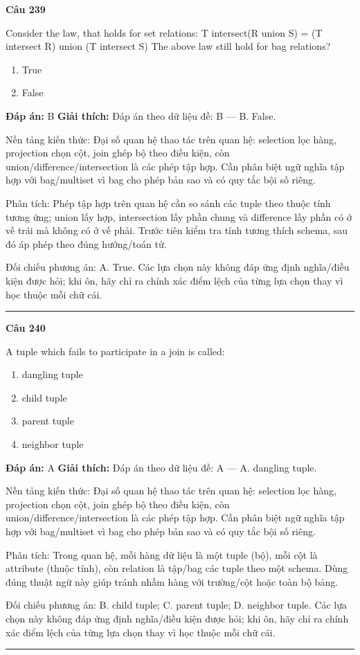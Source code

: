 \documentclass[11pt,a4paper]{article}
\newenvironment{question}[1]{%
  \par\vspace{1em}\noindent\textbf{\large Câu #1}\par\vspace{0.4em}
}{%
  \par\vspace{1em}\hrule\vspace{0.6em}
}
\newenvironment{choices}{%
  \begin{enumerate}[label=\textbf{\Alph*.},leftmargin=2.2em,itemsep=2pt,topsep=3pt]
}{%
  \end{enumerate}
}
\newcommand{\choice}{\item}
\begin{document}
\begin{question}{239}
Consider the law, that holds for set relations:
T intersect(R union S) = (T intersect R) union (T intersect S)
The above law still hold for bag relations?
\begin{choices}
\choice True
\choice False
\end{choices}
\textbf{Đáp án:} B
\textbf{Giải thích:} Đáp án theo dữ liệu đề: B — B. False.

Nền tảng kiến thức: Đại số quan hệ thao tác trên quan hệ: selection lọc hàng, projection chọn cột, join ghép bộ theo điều kiện, còn union/difference/intersection là các phép tập hợp. Cần phân biệt ngữ nghĩa tập hợp với bag/multiset vì bag cho phép bản sao và có quy tắc bội số riêng.

Phân tích: Phép tập hợp trên quan hệ cần so sánh các tuple theo thuộc tính tương ứng; union lấy hợp, intersection lấy phần chung và difference lấy phần có ở vế trái mà không có ở vế phải. Trước tiên kiểm tra tính tương thích schema, sau đó áp phép theo đúng hướng/toán tử.

Đối chiếu phương án: A. True. Các lựa chọn này không đáp ứng định nghĩa/điều kiện được hỏi; khi ôn, hãy chỉ ra chính xác điểm lệch của từng lựa chọn thay vì học thuộc mỗi chữ cái.
\end{question}

\begin{question}{240}
A tuple which fails to participate in a join is called:
\begin{choices}
\choice dangling tuple
\choice child tuple
\choice parent tuple
\choice neighbor tuple
\end{choices}
\textbf{Đáp án:} A
\textbf{Giải thích:} Đáp án theo dữ liệu đề: A — A. dangling tuple.

Nền tảng kiến thức: Đại số quan hệ thao tác trên quan hệ: selection lọc hàng, projection chọn cột, join ghép bộ theo điều kiện, còn union/difference/intersection là các phép tập hợp. Cần phân biệt ngữ nghĩa tập hợp với bag/multiset vì bag cho phép bản sao và có quy tắc bội số riêng.

Phân tích: Trong quan hệ, mỗi hàng dữ liệu là một tuple (bộ), mỗi cột là attribute (thuộc tính), còn relation là tập/bag các tuple theo một schema. Dùng đúng thuật ngữ này giúp tránh nhầm hàng với trường/cột hoặc toàn bộ bảng.

Đối chiếu phương án: B. child tuple; C. parent tuple; D. neighbor tuple. Các lựa chọn này không đáp ứng định nghĩa/điều kiện được hỏi; khi ôn, hãy chỉ ra chính xác điểm lệch của từng lựa chọn thay vì học thuộc mỗi chữ cái.
\end{question}
\end{document}
